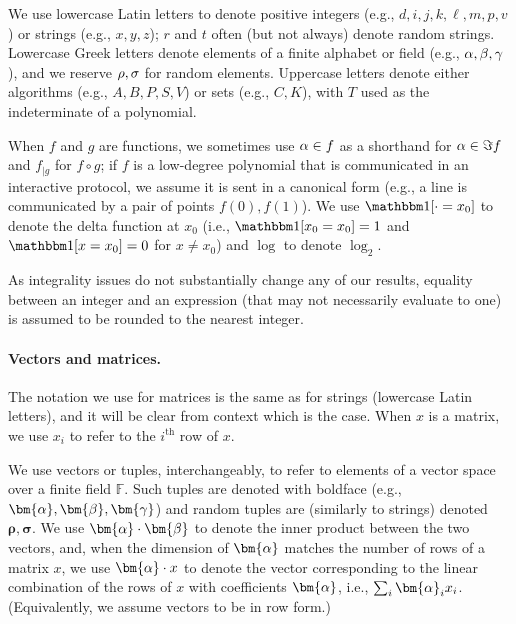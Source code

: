 \documentclass[a4paper,UKenglish,cleveref, autoref, thm-restate]{lipics-v2021}
\theoremstyle{definition}
\newcommand{\field}{\mathbb{F}}
\newcommand{\vcommitlength}{v}
\newcommand{\vcommitstring}{z}
\newcommand{\pcommitlength}{p}
\newcommand{\pcommitstring}{y}
\newcommand{\dimension}{m}
\newcommand{\degree}{d}
\newcommand{\evaluationpoint}{\bm{\fe2}}
\newcommand{\fingerprinttuple}{\bm{\rho}}
\newcommand{\Fingerprinttuple}{\bm{\sigma}}
\newcommand{\chf}{\mathbbm 1}
\def\fe#1{
    \ifnum#1=1
        \alpha
    \else
    \ifnum#1=2
        \beta
    \else
    \ifnum#1=3
        \gamma
    \fi\fi\fi
}
\def\rfe#1{
    \ifnum#1=1
        \rho
    \else
    \ifnum#1=2
        \sigma
    \else
    \fi\fi
}
\begin{document}
    We use lowercase Latin letters to denote positive integers (e.g., $\degree, i, j, k, \ell, \dimension, \pcommitlength, \vcommitlength$) or strings (e.g., $x, \pcommitstring, \vcommitstring$); $r$ and $t$ often (but not always) denote random strings. Lowercase Greek letters denote elements of a finite alphabet or field (e.g., $\fe1, \fe2, \fe3$), and we reserve $\rfe1, \rfe2$ for random elements. 
    Uppercase letters denote either algorithms (e.g., $A, B, P, S, V$) or sets (e.g., $C, K$), with $T$ used as the indeterminate of a polynomial.
    
    When $f$ and $g$ are functions, we sometimes use $\fe1 \in f$ as a shorthand for $\fe1 \in \Im f$ and $f_{|g}$ for $f \circ g$; if $f$ is a low-degree polynomial that is communicated in an interactive protocol, we assume it is sent in a canonical form (e.g., a line is communicated by a pair of points $f(0), f(1)$). We use $\chf[\cdot = x_0]$ to denote the delta function at $x_0$ (i.e., $\chf[x_0 = x_0] = 1$ and $\chf[x = x_0] = 0$ for $x \neq x_0$) and $\log$ to denote $\log_2$.
    
    As integrality issues do not substantially change any of our results, equality between an integer and an expression (that may not necessarily evaluate to one) is assumed to be rounded to the nearest integer.
    
    \paragraph*{Vectors and matrices\iflipics\else.\fi} The notation we use for matrices is the same as for strings (lowercase Latin letters), and it will be clear from context which is the case. When $x$ is a matrix, we use $x_i$ to refer to the $i^\text{th}$ row of $x$.
    
    We use vectors or tuples, interchangeably, to refer to elements of a vector space over a finite field $\field$. Such tuples are denoted with boldface (e.g., $\bm{\fe1}, \evaluationpoint, \bm{\fe3}$) and random tuples are (similarly to strings) denoted $\fingerprinttuple, \Fingerprinttuple$. We use $\bm{\fe1} \cdot \bm{\fe2}$ to denote the inner product between the two vectors, and, when the dimension of $\bm{\fe1}$ matches the number of rows of a matrix $x$, we use $\bm{\fe1} \cdot x$ to denote the vector corresponding to the linear combination of the rows of $x$ with coefficients $\bm{\fe1}$, i.e., $\sum_i \bm{\fe1}_i x_i$. (Equivalently, we assume vectors to be in row form.)
    
\end{document}
